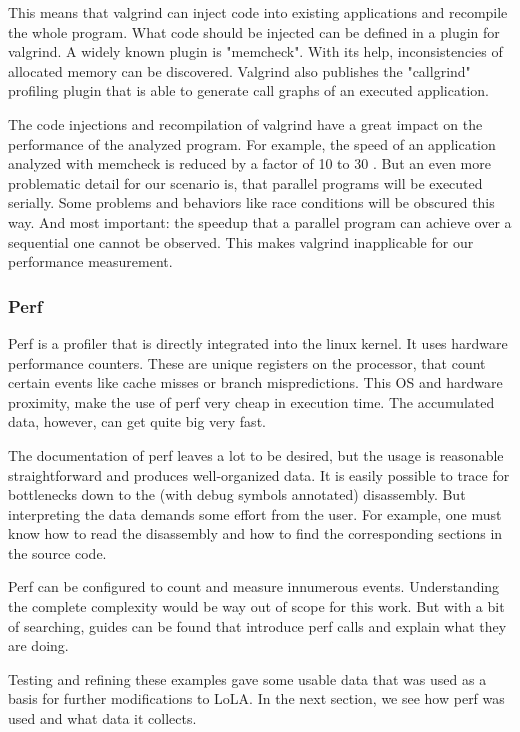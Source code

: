 This means that valgrind can inject code into existing applications and recompile the whole program. What code should be injected can be defined in a plugin for valgrind. A widely known plugin is "memcheck". With its help, inconsistencies of allocated memory can be discovered. Valgrind also publishes the "callgrind" profiling plugin that is able to generate call graphs of an executed application.

The code injections and recompilation of valgrind have a great impact on the performance of the analyzed program. For example, the speed of an application analyzed with memcheck is reduced by a factor of 10 to 30 \cite{valgrindTools}. But an even more problematic detail for our scenario is, that parallel programs will be executed serially. Some problems and behaviors like race conditions will be obscured this way. And most important: the speedup that a parallel program can achieve over a sequential one cannot be observed. This makes valgrind inapplicable for our performance measurement.

\subsubsection{Perf}
Perf is a profiler that is directly integrated into the linux kernel. It uses hardware performance counters. These are unique registers on the processor, that count certain events like cache misses or branch mispredictions. This OS and hardware proximity, make the use of perf very cheap in execution time. The accumulated data, however, can get quite big very fast.

The documentation of perf leaves a lot to be desired, but the usage is reasonable straightforward and produces well-organized data. It is easily possible to trace for bottlenecks down to the (with debug symbols annotated) disassembly. But interpreting the data demands some effort from the user. For example, one must know how to read the disassembly and how to find the corresponding sections in the source code.

Perf can be configured to count and measure innumerous events. Understanding the complete complexity would be way out of scope for this work. But with a bit of searching, guides can be found that introduce perf calls and explain what they are doing\cite{perfExamples}.

Testing and refining these examples gave some usable data that was used as a basis for further modifications to LoLA. In the next section, we see how perf was used and what data it collects.

